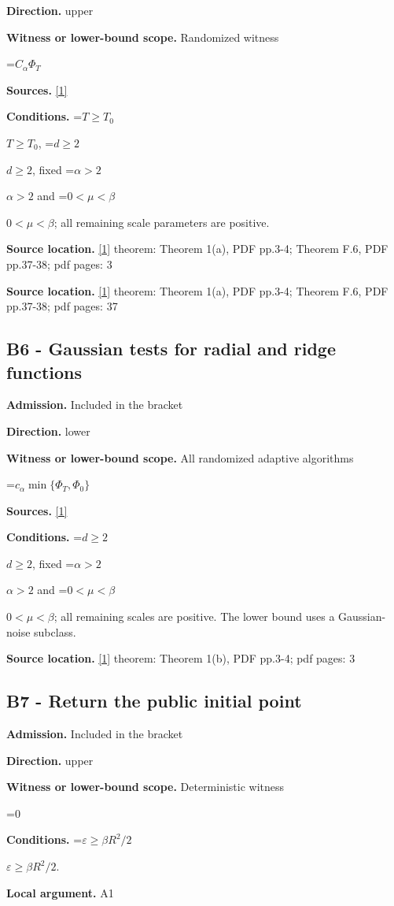 \documentclass[10pt,a4paper]{article}
\newcommand{\AtlasMath}[1]{\par\begingroup\centering\setbox0=\hbox{$\displaystyle #1$}\ifdim\wd0>1.4\linewidth\typeout{ATLAS WIDE FORMULA: \the\wd0}\fi\ifdim\wd0>\linewidth\resizebox{\linewidth}{!}{\box0}\else\box0\fi\par\endgroup}
\newcommand{\AtlasInlineMath}[1]{\begingroup\setbox0=\hbox{$#1$}\ifdim\wd0>.4\linewidth\endgroup\AtlasMath{#1}\else\endgroup$#1$\fi}
\begin{document}
\textbf{Direction.} upper

\textbf{Witness or lower-bound scope.} Randomized witness

\AtlasMath{C_\alpha\Phi_T}
\textbf{Sources.} \href{https://arxiv.org/pdf/2610.05517v2}{[1]}

\textbf{Conditions.} \AtlasInlineMath{T\ge T_0}, \AtlasInlineMath{d\ge2}, fixed \AtlasInlineMath{\alpha>2} and \AtlasInlineMath{0<\mu<\beta}; all remaining scale parameters are positive.

\textbf{Source location.} \href{https://arxiv.org/pdf/2610.05517v2}{[1]} theorem: Theorem 1(a), PDF pp.3-4; Theorem F.6, PDF pp.37-38; pdf pages: 3

\textbf{Source location.} \href{https://arxiv.org/pdf/2610.05517v2}{[1]} theorem: Theorem 1(a), PDF pp.3-4; Theorem F.6, PDF pp.37-38; pdf pages: 37

\subsection{B6 - Gaussian tests for radial and ridge functions}
\textbf{Admission.} Included in the bracket

\textbf{Direction.} lower

\textbf{Witness or lower-bound scope.} All randomized adaptive algorithms

\AtlasMath{c_\alpha\min\{\Phi_T,\Phi_0\}}
\textbf{Sources.} \href{https://arxiv.org/pdf/2610.05517v2}{[1]}

\textbf{Conditions.} \AtlasInlineMath{d\ge2}, fixed \AtlasInlineMath{\alpha>2} and \AtlasInlineMath{0<\mu<\beta}; all remaining scales are positive. The lower bound uses a Gaussian-noise subclass.

\textbf{Source location.} \href{https://arxiv.org/pdf/2610.05517v2}{[1]} theorem: Theorem 1(b), PDF pp.3-4; pdf pages: 3

\subsection{B7 - Return the public initial point}
\textbf{Admission.} Included in the bracket

\textbf{Direction.} upper

\textbf{Witness or lower-bound scope.} Deterministic witness

\AtlasMath{0}
\textbf{Conditions.} \AtlasInlineMath{\varepsilon\ge \beta R^2/2}.

\textbf{Local argument.} A1
\end{document}
